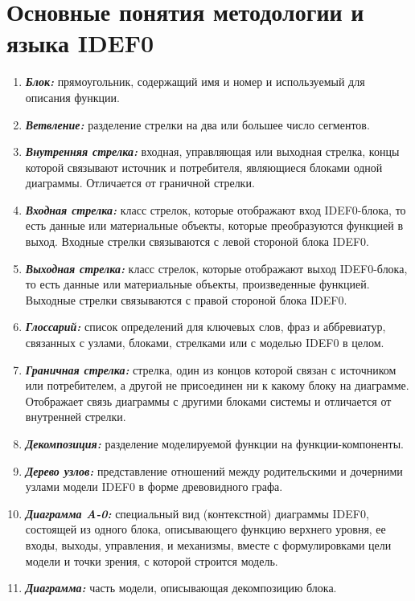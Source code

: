 \documentclass[a4paper, final]{article}
\begin{document}
\newpage
\section{Основные понятия методологии и языка IDEF0}
\begin{enumerate}
  \item \textbf{\textit{Блок:}} прямоугольник, содержащий имя и номер и используемый для описания функции.
  \item \textbf{\textit{Ветвление:}} разделение стрелки на два или большее число сегментов.
  \item \textbf{\textit{Внутренняя стрелка:}} входная, управляющая или выходная стрелка, концы которой связывают источник и потребителя, являющиеся блоками одной диаграммы. Отличается от граничной стрелки.
  \item \textbf{\textit{Входная стрелка:}} класс стрелок, которые отображают вход IDEF0-блока, то есть данные или материальные объекты, которые преобразуются функцией в выход. Входные стрелки связываются с левой стороной блока IDEF0.
  \item \textbf{\textit{Выходная стрелка:}} класс стрелок, которые отображают выход IDEF0-блока, то есть данные или материальные объекты, произведенные функцией. Выходные стрелки связываются с правой стороной блока IDEF0.
  \item \textbf{\textit{Глоссарий:}} список определений для ключевых слов, фраз и аббревиатур, связанных с узлами, блоками, стрелками или с моделью IDEF0 в целом.
  \item \textbf{\textit{Граничная стрелка:}} стрелка, один из концов которой связан с источником или потребителем, а другой не присоединен ни к какому блоку на диаграмме. Отображает связь диаграммы с другими блоками системы и отличается от внутренней стрелки.
  \item \textbf{\textit{Декомпозиция:}} разделение моделируемой функции на функции-компоненты.
  \item \textbf{\textit{Дерево узлов:}} представление отношений между родительскими и дочерними узлами модели IDEF0 в форме древовидного графа.
  \item \textbf{\textit{Диаграмма A-0:}} специальный вид (контекстной) диаграммы IDEF0, состоящей из одного блока, описывающего функцию верхнего уровня, ее входы, выходы, управления, и механизмы, вместе с формулировками цели модели и точки зрения, с которой строится модель.
  \item \textbf{\textit{Диаграмма:}} часть модели, описывающая декомпозицию блока.

\end{enumerate}
\end{document}
